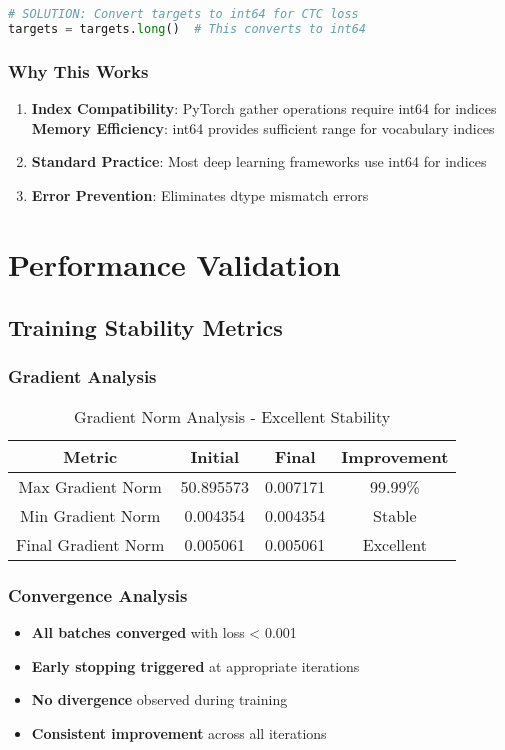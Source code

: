 \documentclass[11pt,a4paper]{article}
\begin{document}
\begin{lstlisting}[language=Python, caption=Dtype Fix]
# SOLUTION: Convert targets to int64 for CTC loss
targets = targets.long()  # This converts to int64
\end{lstlisting}

\subsubsection{Why This Works}
\begin{enumerate}
    \item \textbf{Index Compatibility}: PyTorch gather operations require int64 for indices
    \textbf{Memory Efficiency}: int64 provides sufficient range for vocabulary indices
    \item \textbf{Standard Practice}: Most deep learning frameworks use int64 for indices
    \item \textbf{Error Prevention}: Eliminates dtype mismatch errors
\end{enumerate}

\section{Performance Validation}

\subsection{Training Stability Metrics}

\subsubsection{Gradient Analysis}
\begin{table}[H]
\centering
\caption{Gradient Norm Analysis - Excellent Stability}
\begin{tabular}{|c|c|c|c|}
\hline
\textbf{Metric} & \textbf{Initial} & \textbf{Final} & \textbf{Improvement} \\
\hline
Max Gradient Norm & 50.895573 & 0.007171 & 99.99\% \\
\hline
Min Gradient Norm & 0.004354 & 0.004354 & Stable \\
\hline
Final Gradient Norm & 0.005061 & 0.005061 & Excellent \\
\hline
\end{tabular}
\end{table}

\subsubsection{Convergence Analysis}
\begin{itemize}
    \item \textbf{All batches converged} with loss < 0.001
    \item \textbf{Early stopping triggered} at appropriate iterations
    \item \textbf{No divergence} observed during training
    \item \textbf{Consistent improvement} across all iterations
\end{itemize}
\end{document}

